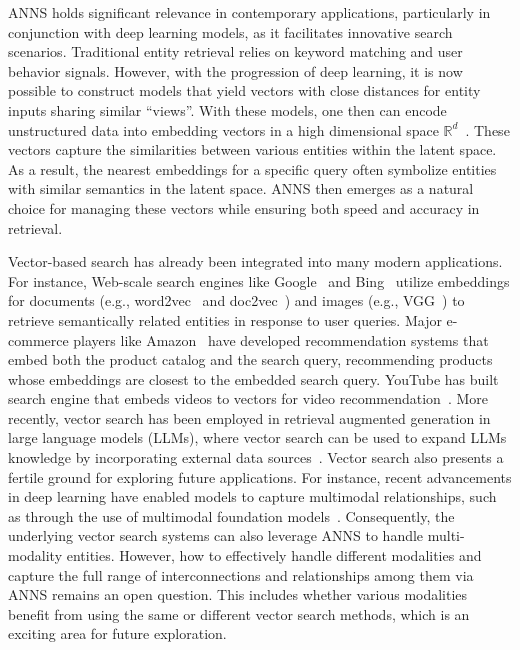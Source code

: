 ANNS holds significant relevance in contemporary applications, particularly in conjunction with deep learning models, as it facilitates innovative search scenarios. Traditional entity retrieval relies on keyword matching and user behavior signals. However, with the progression of deep learning, it is now possible to construct models that yield vectors with close distances for entity inputs sharing similar “views”. With these models, one then can encode unstructured data into embedding vectors in a high dimensional space $\mathds{R}^d$~\cite{dssm,multi-field-neural-ranking}. These vectors capture the similarities between various entities within the latent space. As a result, the nearest embeddings for a specific query often symbolize entities with similar semantics in the latent space. ANNS then emerges as a natural choice for managing these vectors while ensuring both speed and accuracy in retrieval.

Vector-based search has already been integrated into many modern applications. For instance, Web-scale search engines like Google~\cite{rankbrain} and Bing~\cite{sptag,diskann} utilize embeddings for documents (e.g., word2vec~\cite{word2vec} and doc2vec~\cite{doc2vec}) and images (e.g., VGG~\cite{vgg}) to retrieve semantically related entities in response to user queries. Major e-commerce players like Amazon~\cite{amazon-search} have developed recommendation systems that embed both the product catalog and the search query, recommending products whose embeddings are closest to the embedded search query. YouTube has built search engine that embeds videos to vectors for video recommendation~\cite{youtube-embed}. More recently, vector search has been employed in retrieval augmented generation in large language models (LLMs), where vector search can be used to expand LLMs knowledge by incorporating external data sources~\cite{retrieval-augmented-generation-deepmind}. Vector search also presents a fertile ground for exploring future applications. For instance, recent advancements in deep learning have enabled models to capture multimodal relationships, such as through the use of multimodal foundation models~\cite{multimodal}. Consequently, the underlying vector search systems can also leverage ANNS to handle multi-modality entities. However, how to effectively handle different modalities and capture the full range of interconnections and relationships among them via ANNS remains an open question. This includes whether various modalities benefit from using the same or different vector search methods, which is an exciting area for future exploration.

